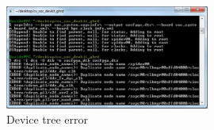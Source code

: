 \begin{figure}[h]
	\centering		\includegraphics[width=0.6\textwidth]{img/devicetreeerror}
	\caption{Device tree error}
    	\label{fig:devicetreeerror}
\end{figure}





